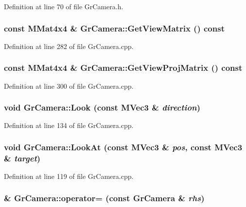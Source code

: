 Definition at line 70 of file GrCamera.h.\hypertarget{class_gr_camera_792760eaf71f2eb7d7d92fca1897de35}{
\subsubsection[{GetViewMatrix}]{\setlength{\rightskip}{0pt plus 5cm}const {\bf MMat4x4} \& GrCamera::GetViewMatrix () const}}
\label{class_gr_camera_792760eaf71f2eb7d7d92fca1897de35}




Definition at line 282 of file GrCamera.cpp.\hypertarget{class_gr_camera_a9a8ab5d4d339a769d58e0fa4f1bc823}{
\subsubsection[{GetViewProjMatrix}]{\setlength{\rightskip}{0pt plus 5cm}const {\bf MMat4x4} \& GrCamera::GetViewProjMatrix () const}}
\label{class_gr_camera_a9a8ab5d4d339a769d58e0fa4f1bc823}




Definition at line 300 of file GrCamera.cpp.\hypertarget{class_gr_camera_2a10b8915e3841e221e4f7c4effedab0}{
\subsubsection[{Look}]{\setlength{\rightskip}{0pt plus 5cm}void GrCamera::Look (const {\bf MVec3} \& {\em direction})}}
\label{class_gr_camera_2a10b8915e3841e221e4f7c4effedab0}




Definition at line 134 of file GrCamera.cpp.\hypertarget{class_gr_camera_8106933669523efe81e1eef160d16d21}{
\subsubsection[{LookAt}]{\setlength{\rightskip}{0pt plus 5cm}void GrCamera::LookAt (const {\bf MVec3} \& {\em pos}, \/  const {\bf MVec3} \& {\em target})}}
\label{class_gr_camera_8106933669523efe81e1eef160d16d21}




Definition at line 119 of file GrCamera.cpp.\hypertarget{class_gr_camera_84bbadfceeb70f60ff81775d85a21a1f}{
\subsubsection[{operator=}]{ \& GrCamera::operator= (const {\bf GrCamera} \& {\em rhs})}}
\label{class_gr_camera_84bbadfceeb70f60ff81775d85a21a1f}




